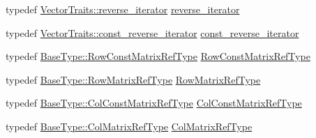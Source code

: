 \begin{DoxyCompactItemize}
\item 
typedef \hyperlink{classvct_fixed_size_vector_traits_a46a61657ee7bece7277e0b59c4e0ea41}{Vector\+Traits\+::reverse\+\_\+iterator} \hyperlink{classvct_fixed_size_vector_base_af7dffb6aaecd3c33141026726e3a4852}{reverse\+\_\+iterator}
\item 
typedef \hyperlink{classvct_fixed_size_vector_traits_a66365350e5fae26c9cf29a3ce0bb4a60}{Vector\+Traits\+::const\+\_\+reverse\+\_\+iterator} \hyperlink{classvct_fixed_size_vector_base_a51b27cb7a2a0f7cd5c3352deda9bce98}{const\+\_\+reverse\+\_\+iterator}
\end{DoxyCompactItemize}
{\bf }\par
\begin{DoxyCompactItemize}
\item 
typedef \hyperlink{classvct_fixed_size_const_vector_base_ab7c118dbf79db9194157ced0e4549814}{Base\+Type\+::\+Row\+Const\+Matrix\+Ref\+Type} \hyperlink{classvct_fixed_size_vector_base_a8f1918b51b34a75973890b1b898b1991}{Row\+Const\+Matrix\+Ref\+Type}
\item 
typedef \hyperlink{classvct_fixed_size_const_vector_base_a1f9ff7c6b2b3f98c51d1bf3eefdfbd32}{Base\+Type\+::\+Row\+Matrix\+Ref\+Type} \hyperlink{classvct_fixed_size_vector_base_a880e7f696c2064b9e0339290e6a92c3f}{Row\+Matrix\+Ref\+Type}
\end{DoxyCompactItemize}

{\bf }\par
\begin{DoxyCompactItemize}
\item 
typedef \hyperlink{classvct_fixed_size_const_vector_base_a7dd213f3b90969b8c89fd0766cf0a70e}{Base\+Type\+::\+Col\+Const\+Matrix\+Ref\+Type} \hyperlink{classvct_fixed_size_vector_base_af2eb123c105381e108d3a94c3ba301b4}{Col\+Const\+Matrix\+Ref\+Type}
\item 
typedef \hyperlink{classvct_fixed_size_const_vector_base_ac2454662f16abd75fdef4ce8d2a00a48}{Base\+Type\+::\+Col\+Matrix\+Ref\+Type} \hyperlink{classvct_fixed_size_vector_base_a6b661e308612cbe1c894c62812c272e2}{Col\+Matrix\+Ref\+Type}
\end{DoxyCompactItemize}

